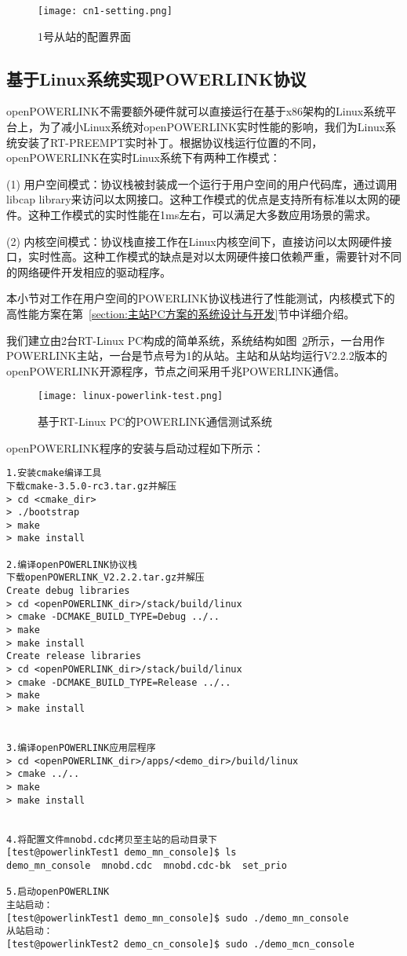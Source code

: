 \begin{figure}[!htb]
  \centering
  \texttt{[image: cn1-setting.png]}
  \caption{1号从站的配置界面}
  \label{fig:cn1-setting}
\end{figure}

\subsection{基于Linux系统实现POWERLINK协议}

openPOWERLINK不需要额外硬件就可以直接运行在基于x86架构的Linux系统平台上，为了减小Linux系统对openPOWERLINK实时性能的影响，我们为Linux系统安装了RT-PREEMPT实时补丁。根据协议栈运行位置的不同，openPOWERLINK在实时Linux系统下有两种工作模式\cite{wallner}：

(1) 用户空间模式：协议栈被封装成一个运行于用户空间的用户代码库，通过调用libcap library来访问以太网接口。这种工作模式的优点是支持所有标准以太网的硬件。这种工作模式的实时性能在1ms左右，可以满足大多数应用场景的需求。

(2) 内核空间模式：协议栈直接工作在Linux内核空间下，直接访问以太网硬件接口，实时性高。这种工作模式的缺点是对以太网硬件接口依赖严重，需要针对不同的网络硬件开发相应的驱动程序。

本小节对工作在用户空间的POWERLINK协议栈进行了性能测试，内核模式下的高性能方案在第~\ref{section:主站PC方案的系统设计与开发}节中详细介绍。

我们建立由2台RT-Linux PC构成的简单系统，系统结构如图~\ref{fig:linux-powerlink-test}所示，一台用作POWERLINK主站，一台是节点号为1的从站。主站和从站均运行V2.2.2版本的openPOWERLINK开源程序，节点之间采用千兆POWERLINK通信。

\begin{figure}[!htb]
  \centering
  \texttt{[image: linux-powerlink-test.png]}
  \caption{基于RT-Linux PC的POWERLINK通信测试系统}
  \label{fig:linux-powerlink-test}
\end{figure}

openPOWERLINK程序的安装与启动过程如下所示：

\begin{lstlisting}
1.安装cmake编译工具
下载cmake-3.5.0-rc3.tar.gz并解压
> cd <cmake_dir>
> ./bootstrap
> make
> make install

2.编译openPOWERLINK协议栈
下载openPOWERLINK_V2.2.2.tar.gz并解压
Create debug libraries
> cd <openPOWERLINK_dir>/stack/build/linux
> cmake -DCMAKE_BUILD_TYPE=Debug ../..
> make
> make install
Create release libraries
> cd <openPOWERLINK_dir>/stack/build/linux
> cmake -DCMAKE_BUILD_TYPE=Release ../..
> make
> make install


3.编译openPOWERLINK应用层程序
> cd <openPOWERLINK_dir>/apps/<demo_dir>/build/linux
> cmake ../..
> make
> make install


4.将配置文件mnobd.cdc拷贝至主站的启动目录下
[test@powerlinkTest1 demo_mn_console]$ ls
demo_mn_console  mnobd.cdc  mnobd.cdc-bk  set_prio

5.启动openPOWERLINK
主站启动：
[test@powerlinkTest1 demo_mn_console]$ sudo ./demo_mn_console
从站启动：
[test@powerlinkTest2 demo_cn_console]$ sudo ./demo_mcn_console

\end{lstlisting}

